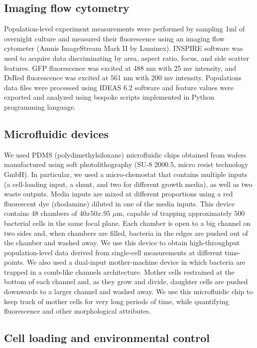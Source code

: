 \documentclass[fleqn,12pt]{wlscirep}
\begin{document}
\subsection{Imaging flow cytometry}

Population-level experiment measurements were performed by sampling 1ml of overnight culture and measured their fluorescence using an imaging flow cytometer (Amnis ImageStream Mark II by Luminex). INSPIRE software was used to acquire data discriminating by area, aspect ratio, focus, and side scatter features. GFP fluorescence was excited at 488 nm with 25 mv intensity, and DsRed fluorescence was excited at 561 nm with 200 mv intensity. Populations data files were processed using IDEAS 6.2 software and feature values were exported and analyzed using bespoke scripts implemented in Python programming language. 
\subsection{Microfluidic devices}

We used PDMS (polydimethylsiloxane) microfluidic chips obtained from wafers manufactured using soft photolithography (SU-8 2000.5, micro resist technology GmbH).
In particular, we used a micro-chemostat \cite{mondragon2011entrainment} that contains multiple inputs (a cell-loading input, a shunt, and two for different growth media), as well as two waste outputs. Media inputs are mixed at different proportions using a red fluorescent dye (rhodamine) diluted in one of the media inputs. This device contains 48 chambers of $40x50x.95$ $\mu$m, capable of trapping approximately $500$ bacterial cells in the same focal plane.  
Each chamber is open to a big channel on two sides and, when chambers are filled, bacteria in the edges are pushed out of the chamber and washed away. We use this device to obtain high-throughput population-level data derived from single-cell measurements at different time-points.
We also used a dual-input mother-machine \cite{Kaiser2018} device in which bacteria are trapped in a comb-like channels architecture. Mother cells restrained at the bottom of each channel and, as they grow and divide, daughter cells are pushed downwards to a larger channel and washed away. We use this microfluidic chip to keep track of mother cells for very long periods of time, while quantifying fluorescence and other morphological attributes.

\subsection{Cell loading and environmental control}
\end{document}
